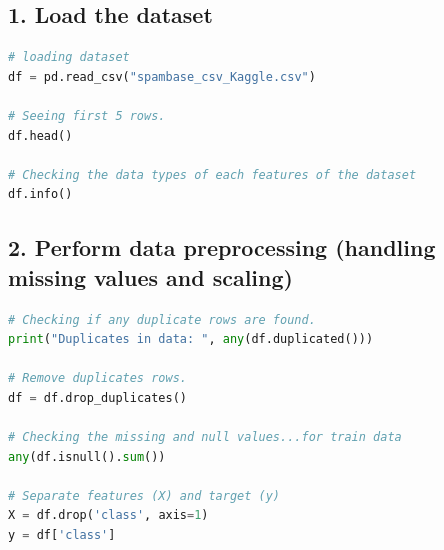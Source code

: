 \documentclass[11pt]{article}
\begin{document}
\subsection*{1. Load the dataset}
\begin{lstlisting}[language=Python]
# loading dataset
df = pd.read_csv("spambase_csv_Kaggle.csv")

# Seeing first 5 rows.
df.head()

# Checking the data types of each features of the dataset
df.info()
\end{lstlisting}

\subsection*{2. Perform data preprocessing (handling missing values and scaling)}
\begin{lstlisting}[language=Python]
# Checking if any duplicate rows are found.
print("Duplicates in data: ", any(df.duplicated()))

# Remove duplicates rows.
df = df.drop_duplicates()

# Checking the missing and null values...for train data
any(df.isnull().sum())

# Separate features (X) and target (y)
X = df.drop('class', axis=1)
y = df['class']
\end{lstlisting}
\end{document}
